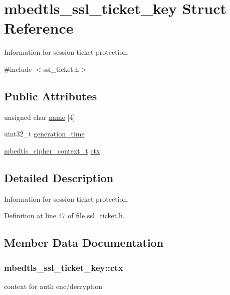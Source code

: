 \hypertarget{structmbedtls__ssl__ticket__key}{\section{mbedtls\-\_\-ssl\-\_\-ticket\-\_\-key Struct Reference}
\label{structmbedtls__ssl__ticket__key}
}


Information for session ticket protection.  




{\ttfamily \#include $<$ssl\-\_\-ticket.\-h$>$}

\subsection*{Public Attributes}
\begin{DoxyCompactItemize}
\item 
unsigned char \hyperlink{structmbedtls__ssl__ticket__key_a5c80ec11a07ab4e19e775f7586a11d21}{name} \mbox{[}4\mbox{]}
\item 
uint32\-\_\-t \hyperlink{structmbedtls__ssl__ticket__key_ada9d97d06d4c215e4810880427ca50ad}{generation\-\_\-time}
\item 
\hyperlink{structmbedtls__cipher__context__t}{mbedtls\-\_\-cipher\-\_\-context\-\_\-t} \hyperlink{structmbedtls__ssl__ticket__key_ad347a5aa480ee9df7f32c16d1bd56aae}{ctx}
\end{DoxyCompactItemize}


\subsection{Detailed Description}
Information for session ticket protection. 

Definition at line 47 of file ssl\-\_\-ticket.\-h.



\subsection{Member Data Documentation}
\hypertarget{structmbedtls__ssl__ticket__key_ad347a5aa480ee9df7f32c16d1bd56aae}{
\subsubsection[{ctx}]{ mbedtls\-\_\-ssl\-\_\-ticket\-\_\-key\-::ctx}}\label{structmbedtls__ssl__ticket__key_ad347a5aa480ee9df7f32c16d1bd56aae}
context for auth enc/decryption 

